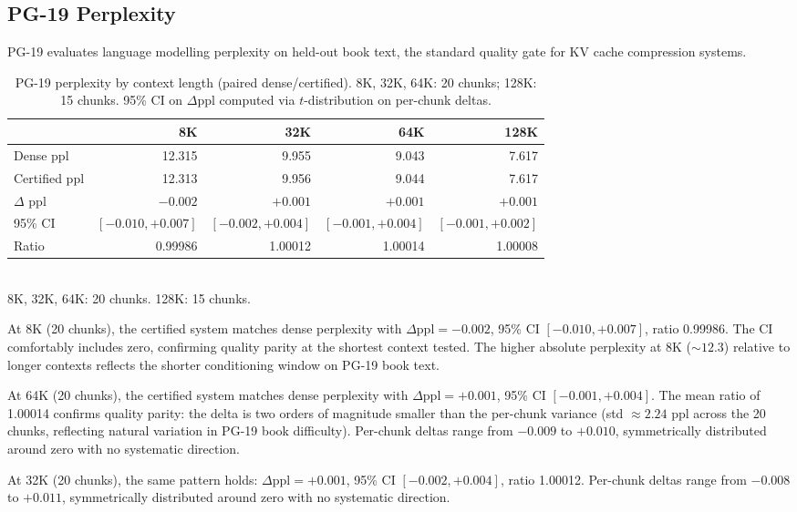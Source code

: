 \documentclass[11pt,a4paper]{article}
\theoremstyle{definition}
\theoremstyle{remark}
\begin{document}
\subsection{PG-19 Perplexity}

PG-19 evaluates language modelling perplexity on held-out book text, the standard quality gate for KV cache compression systems.

\begin{table}[H]
\centering
\caption{PG-19 perplexity by context length (paired dense/certified).  8K, 32K, 64K: 20 chunks; 128K: 15 chunks.  95\% CI on $\Delta$ppl computed via $t$-distribution on per-chunk deltas.}
\label{tab:pg19}
\small
\begin{tabular}{lrrrr}
\toprule
& \textbf{8K} & \textbf{32K} & \textbf{64K} & \textbf{128K} \\
\midrule
Dense ppl     & 12.315 & 9.955 & 9.043 & 7.617 \\
Certified ppl & 12.313 & 9.956 & 9.044 & 7.617 \\
$\Delta$ ppl  & $-0.002$ & $+0.001$ & $+0.001$ & $+0.001$ \\
95\% CI       & $[-0.010, +0.007]$ & $[-0.002, +0.004]$ & $[-0.001, +0.004]$ & $[-0.001, +0.002]$ \\
Ratio         & 0.99986 & 1.00012 & 1.00014 & 1.00008 \\
\bottomrule
\end{tabular}
\\[2pt]
{\scriptsize 8K, 32K, 64K: 20 chunks.  128K: 15 chunks.}
\end{table}

At 8K (20 chunks), the certified system matches dense perplexity with $\Delta\mathrm{ppl}{=}{-}0.002$, 95\% CI $[-0.010, +0.007]$, ratio 0.99986.  The CI comfortably includes zero, confirming quality parity at the shortest context tested.  The higher absolute perplexity at 8K (${\sim}12.3$) relative to longer contexts reflects the shorter conditioning window on PG-19 book text.

At 64K (20 chunks), the certified system matches dense perplexity with $\Delta\mathrm{ppl}{=}{+}0.001$, 95\% CI $[-0.001, +0.004]$.  The mean ratio of 1.00014 confirms quality parity: the delta is two orders of magnitude smaller than the per-chunk variance (std $\approx 2.24$ ppl across the 20 chunks, reflecting natural variation in PG-19 book difficulty).  Per-chunk deltas range from $-0.009$ to $+0.010$, symmetrically distributed around zero with no systematic direction.

At 32K (20 chunks), the same pattern holds: $\Delta\mathrm{ppl}{=}{+}0.001$, 95\% CI $[-0.002, +0.004]$, ratio 1.00012.  Per-chunk deltas range from $-0.008$ to $+0.011$, symmetrically distributed around zero with no systematic direction.
\end{document}
